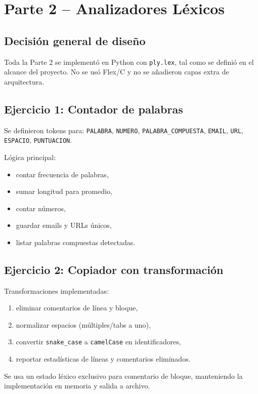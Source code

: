 \documentclass[12pt]{article}
\begin{document}
\section{Parte 2 -- Analizadores Léxicos}

\subsection{Decisión general de diseño}
Toda la Parte 2 se implementó en Python con \texttt{ply.lex}, tal como se definió en el alcance del proyecto.
No se usó Flex/C y no se añadieron capas extra de arquitectura.

\subsection{Ejercicio 1: Contador de palabras}
Se definieron tokens para:
\texttt{PALABRA}, \texttt{NUMERO}, \texttt{PALABRA\_COMPUESTA}, \texttt{EMAIL}, \texttt{URL}, \texttt{ESPACIO}, \texttt{PUNTUACION}.

Lógica principal:
\begin{itemize}[leftmargin=*]
    \item contar frecuencia de palabras,
    \item sumar longitud para promedio,
    \item contar números,
    \item guardar emails y URLs únicos,
    \item listar palabras compuestas detectadas.
\end{itemize}

\subsection{Ejercicio 2: Copiador con transformación}
Transformaciones implementadas:
\begin{enumerate}[leftmargin=*]
    \item eliminar comentarios de línea y bloque,
    \item normalizar espacios (múltiples/tabs a uno),
    \item convertir \texttt{snake\_case} a \texttt{camelCase} en identificadores,
    \item reportar estadísticas de líneas y comentarios eliminados.
\end{enumerate}

Se usa un estado léxico exclusivo para comentario de bloque, manteniendo la implementación en memoria y salida a archivo.
\end{document}
